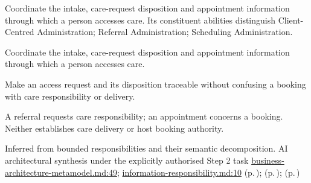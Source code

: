 Coordinate the intake, care-request disposition and appointment information through which a person accesses care. Its constituent abilities distinguish Client-Centred Administration; Referral Administration; Scheduling Administration.



Coordinate the intake, care-request disposition and appointment information through which a person accesses care.



Make an access request and its disposition traceable without confusing a booking with care responsibility or delivery.



A referral requests care responsibility; an appointment concerns a booking. Neither establishes care delivery or host booking authority.


Inferred from bounded responsibilities and their semantic decomposition. AI architectural synthesis under the explicitly authorised Step 2 task \hyperref[evidence:4bac85accd34ce0b]{business-architecture-metamodel.md:49}; \hyperref[evidence:be61392fefb4bb10]{information-responsibility.md:10}
 (p.\,\pageref{cap:bec-client-centred-administration});  (p.\,\pageref{cap:bec-referral-administration});  (p.\,\pageref{cap:bec-scheduling-administration})
